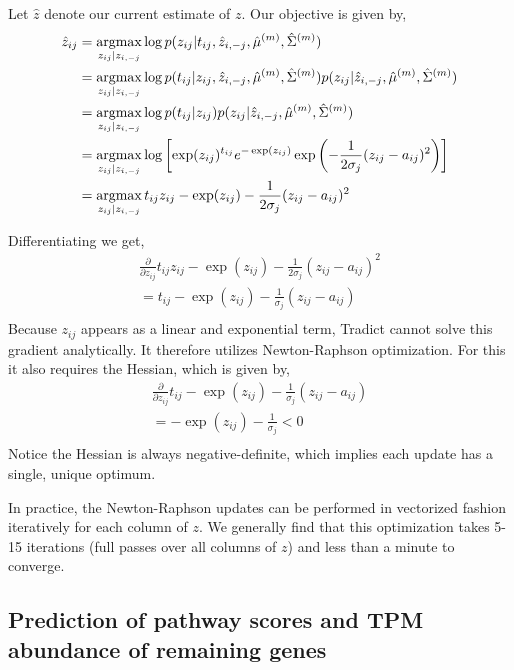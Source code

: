 \documentclass[10pt]{article}
\newcommand{\argmax}{\operatornamewithlimits{argmax}}
\begin{document}
Let $\hat{z}$ denote our current estimate of $z$. Our objective is given by,
\begin{align*}
\hat{z}_{ij} & = \argmax_{z_{ij} | z_{i,-j}} \log p(z_{ij} | t_{ij}, \hat{z}_{i,-j}, \hat{\mu}^{(m)}, \hat{\Sigma}^{(m)}) \\
& = \argmax_{z_{ij} | z_{i,-j} } \log p(t_{ij} | z_{ij}, \hat{z}_{i,-j}, \hat{\mu}^{(m)}, \hat{\Sigma}^{(m)})p(z_{ij} | \hat{z}_{i,-j}, \hat{\mu}^{(m)}, \hat{\Sigma}^{(m)})  \\
& = \argmax_{z_{ij} | z_{i,-j} } \log p(t_{ij} | z_{ij})p(z_{ij} | \hat{z}_{i,-j}, \hat{\mu}^{(m)}, \hat{\Sigma}^{(m)})  \\
& = \argmax_{z_{ij} | z_{i,-j} } \log \left[ \exp(z_{ij})^{t_{ij}}  e^{-\exp(z_{ij})} \exp \left( -\frac{1}{2\sigma_j}(z_{ij} - a_{ij})^2 \right) \right] \\
& = \argmax_{z_{ij} | z_{i,-j} }  t_{ij}z_{ij} -\exp(z_{ij})  -\frac{1}{2\sigma_j}(z_{ij} - a_{ij})^2 
\end{align*}

Differentiating we get,
\begin{align*}
\frac{\partial}{\partial z_{ij}}  t_{ij}z_{ij} -\exp(z_{ij})  -\frac{1}{2\sigma_j}(z_{ij} - a_{ij})^2 \\ 
= t_{ij} - \exp(z_{ij})  -\frac{1}{\sigma_j}(z_{ij} - a_{ij}) \\ 
\end{align*}
Because $z_{ij}$ appears as a linear and exponential term, Tradict cannot solve this gradient analytically. It therefore utilizes Newton-Raphson optimization. For this it also requires the Hessian, which is given by,  
\begin{align*}
\frac{\partial}{\partial z_{ij}} t_{ij} - \exp(z_{ij})  -\frac{1}{\sigma_j}(z_{ij} - a_{ij}) \\ 
=  -\exp(z_{ij})  - \frac{1}{\sigma_j} < 0\\ 
\end{align*}
Notice the Hessian is always negative-definite, which implies each update has a single, unique optimum. 

In practice, the Newton-Raphson updates can be performed in vectorized fashion iteratively for each column of $z$. We generally find that this optimization takes 5-15 iterations (full passes over all columns of $z$) and less than a minute to converge.  

\subsection{Prediction of pathway scores and TPM abundance of remaining genes}
\end{document}

